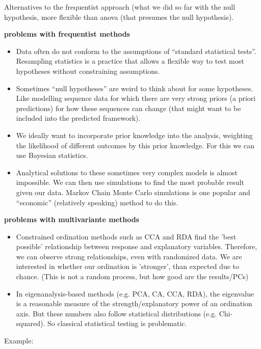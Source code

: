 \documentclass{article}
\begin{document}
Alternatives to the frequentist approach (what we did so far with the null hypothesis, more flexible than anova (that presumes the null hypothesis).

\textbf{problems with frequentist methods}
\begin{itemize}
    \item Data often do not conform to the assumptions of “standard statistical tests”. Resampling statistics is a practice that allows a flexible way to test most hypotheses without constraining assumptions.
    \item Sometimes “null hypotheses” are weird to think about for some hypotheses. Like modelling sequence data for which there are very strong priors (a priori predictions) for how these sequences can change (that might want to be included into the predicted framework).
    \item We ideally want to incorporate prior knowledge into the analysis, weighting the likelihood of different outcomes by this prior knowledge. For this we can use Bayesian statistics.
    \item Analytical solutions to these sometimes very complex models is almost impossible. We can then use simulations to find the most probable result given our data. Markov Chain Monte Carlo simulations is one popular and “economic” (relatively speaking) method to do this.
\end{itemize}

\textbf{problems with multivariante methods}
\begin{itemize}
    \item Constrained ordination methods such as CCA and RDA find the 'best possible' relationship between response and explanatory variables. Therefore, we can observe strong relationships, even with randomized data. We are interested in whether our ordination is 'stronger', than expected due to chance. (This is not a random process, but how good are the results/PCs)
    \item In eigenanalysis-based methods (e.g. PCA, CA, CCA, RDA), the eigenvalue is a reasonable measure of the strength/explanatory power of an ordination axis. But these numbers also follow statistical distributions (e.g. Chi-squared). So classical statistical testing is problematic.
\end{itemize}

Example:
\end{document}
